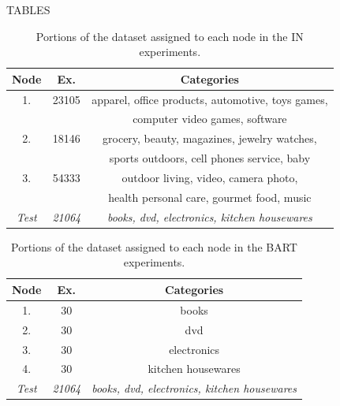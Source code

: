 TABLES
\setlength\parindent{24pt}
        \begin{table}[h!]
        \centering
        \begin{tabular}{|c|c|c|}
        \hline
        Node & Ex. & Categories\\
        \hline
        1. & 23105 & apparel, office products, automotive, toys games, \\ 
        & &  computer video games, software\\
        2. & 18146 & grocery, beauty, magazines, jewelry watches, \\
        & & sports outdoors, cell phones service, baby\\
        3. & 54333 & outdoor living, video, camera photo, \\
        & & health personal care, gourmet food, music\\
        \textit{Test} & \textit{21064} & \textit{books, dvd, electronics, kitchen housewares}\\
        \hline
        \end{tabular}
        \caption{Portions of the dataset assigned to each node in the IN experiments.}\label{tab:cats_in}
        \end{table}




        \begin{table}[h!]
        \centering
        \begin{tabular}{|c|c|c|}
        \hline
        Node & Ex. & Categories\\
        \hline
        1. & 30 & books\\
        2. & 30 & dvd\\
        3. & 30 & electronics\\
        4. & 30 & kitchen housewares\\
        \textit{Test} & \textit{21064} & \textit{books, dvd, electronics, kitchen housewares}\\
        \hline
        \end{tabular}
        \caption{Portions of the dataset assigned to each node in the BART experiments.}\label{tab:cats_b}
        \end{table}
        

